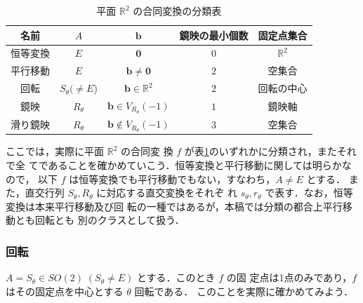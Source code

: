 \documentclass[11pt, uplatex, dvipdfmx, titlepage]{jsarticle}
\theoremstyle{definition}
\begin{document}
\begin{table}[h]
  \centering
  \begin{tabular}[h]{|c|c|c|c|c|}\hline
    名前 & $A$ & $\bm{b}$ & 鏡映の最小個数 & 固定点集合\\ \hline
    恒等変換 & $E$ & $\bm{0}$ & $0$ & $\mathbb{R}^2$ \\
    平行移動 & $E$ & $\bm{b} \neq \bm{0}$ & $2$ & 空集合\\
    回転 & $S_{\theta} (\neq E$) & $\bm{b} \in \mathbb{R}^2$ & $2$ & 回転の中心\\
    鏡映 & $R_{\theta}$ & $\bm{b} \in V_{R_{\theta}}(-1)$ & $1$ & 鏡映軸  \\
    滑り鏡映 & $R_{\theta}$ & $\bm{b} \notin V_{R_{\theta}}(-1)$ & $3$ & 空集合\\ \hline
  \end{tabular}
  \caption{平面 $\mathbb{R}^2$ の合同変換の分類表}
  \label{tab:classification2}
\end{table}


ここでは，実際に平面 $\mathbb{R}^2$ の合同変
換 $f$ が表\ref{tab:classification2}のいずれかに分類され，またそれで全
てであることを確かめていこう．恒等変換と平行移動に関しては明らかなので，
以下 $f$ は恒等変換でも平行移動でもない，すなわち，$A \neq E$ とする．
また，直交行列 $S_{\theta}, R_{\theta}$ に対応する直交変換をそれぞ
れ $s_{\theta}, r_{\theta}$ で表す．なお，恒等変換は本来平行移動及び回
転の一種ではあるが，本稿では分類の都合上平行移動とも回転とも
別のクラスとして扱う．

\subsubsection{回転}\label{sec:rotation2}

$A = S_{\theta} \in SO(2) \; (S_{\theta} \neq E)$ とする．このとき $f$ の固
定点は1点のみであり，$f$ はその固定点を中心とする $\theta$ 回転である．
このことを実際に確かめてみよう．
\end{document}
